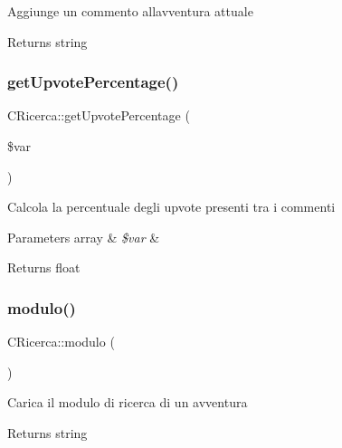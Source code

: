 Aggiunge un commento all\textquotesingle{}avventura attuale

\begin{DoxyReturn}{Returns}
string 
\end{DoxyReturn}
\mbox{\label{class_c_ricerca_a1792ba41fe84b680ca7cee896402a83a}} 
\subsubsection{\texorpdfstring{get\+Upvote\+Percentage()}{getUpvotePercentage()}}
{\footnotesize\ttfamily C\+Ricerca\+::get\+Upvote\+Percentage (\begin{DoxyParamCaption}\item[{}]{\$var }\end{DoxyParamCaption})}

Calcola la percentuale degli upvote presenti tra i commenti


\begin{DoxyParams}[1]{Parameters}
array & {\em \$var} & \\
\hline
\end{DoxyParams}
\begin{DoxyReturn}{Returns}
float 
\end{DoxyReturn}
\mbox{\label{class_c_ricerca_a149757b6826a18b0b3da3045cbeadd4c}} 
\subsubsection{\texorpdfstring{modulo()}{modulo()}}
{\footnotesize\ttfamily C\+Ricerca\+::modulo (\begin{DoxyParamCaption}{ }\end{DoxyParamCaption})}

Carica il modulo di ricerca di un avventura

\begin{DoxyReturn}{Returns}
string 
\end{DoxyReturn}
\mbox{\label{class_c_ricerca_a33fcd2d514cb41fbffcdc8bdd97c6176}} 
